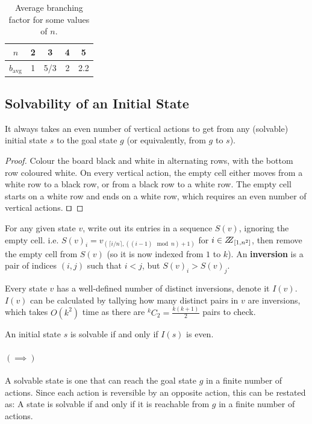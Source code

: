 \documentclass[runningheads]{llncs}
\begin{document}
\begin{table}[h]
\centering
\caption{Average branching factor for some values of $n$.}
\label{tab:results}
\begin{tabular}{|c||c|c|c|c|} \hline
$n$            & 2 &   3 & 4 & 5 \\ \hline
$b_\text{avg}$ & 1 & 5/3 & 2 & 2.2 \\ \hline
\end{tabular}
\end{table}

\subsection{Solvability of an Initial State \cite{Solvability}}
\label{subsec:solvability}
\begin{lemma}\label{lem:evennumofvertactions}
It always takes an even number of vertical actions to get from any (solvable) initial state $s$ to the goal state $g$ (or equivalently, from $g$ to $s$).
\end{lemma}
\begin{proof}
Colour the board black and white in alternating rows, with the bottom row coloured white. On every vertical action, the empty cell either moves from a white row to a black row, or from a black row to a white row. The empty cell starts on a white row and ends on a white row, which requires an even number of vertical actions. $\qed$
\end{proof}

\begin{definition}\label{def:inversion}
For any given state $v$, write out its entries in a sequence $S(v)$, ignoring the empty cell. i.e. $S(v)_i = v_{(\lceil i/n\rceil, ((i-1) \mod n) +1)}$ for $i \in \bbbz_{[1,n^2]}$, then remove the empty cell from $S(v)$ (so it is now indexed from $1$ to $k$). An \textbf{inversion} is a pair of indices $(i,j)$ such that $i < j$, but $S(v)_i > S(v)_j$.
\end{definition}
Every state $v$ has a well-defined number of distinct inversions, denote it $I(v)$. $I(v)$ can be calculated by tallying how many distinct pairs in $v$ are inversions, which takes $O(k^2)$ time as there are $^kC_2 = \frac{k(k+1)}{2}$ pairs to check.

\begin{theorem}\label{thm:solvability}
An initial state $s$ is solvable if and only if $I(s)$ is even.
\end{theorem}
\paragraph{$(\implies)$}
A solvable state is one that can reach the goal state $g$ in a finite number of actions. Since each action is reversible by an opposite action, this can be restated as: A state is solvable if and only if it is reachable from $g$ in a finite number of actions.
\end{document}
